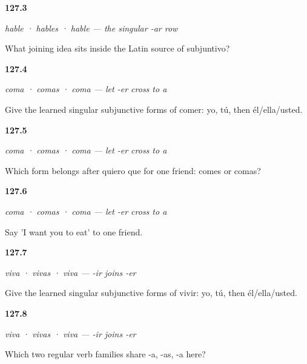 \noindent\begin{minipage}[t]{\linewidth}
\raggedright
\hypertarget{review-ES-C18-subjuntivo-name}{\textbf{127.3}} \emph{hable · hables · hable — the singular -ar row}\par
\small What joining idea sits inside the Latin source of subjuntivo?
\end{minipage}\par\medskip

\noindent\begin{minipage}[t]{\linewidth}
\raggedright
\hypertarget{review-ES-C18-comer-subjuntivo-forms}{\textbf{127.4}} \emph{coma · comas · coma — let -er cross to a}\par
\small Give the learned singular subjunctive forms of comer: yo, tú, then él/ella/usted.
\end{minipage}\par\medskip

\noindent\begin{minipage}[t]{\linewidth}
\raggedright
\hypertarget{review-ES-C18-comer-subjuntivo-fact-wish}{\textbf{127.5}} \emph{coma · comas · coma — let -er cross to a}\par
\small Which form belongs after quiero que for one friend: comes or comas?
\end{minipage}\par\medskip

\noindent\begin{minipage}[t]{\linewidth}
\raggedright
\hypertarget{review-ES-C18-comer-subjuntivo-wanted}{\textbf{127.6}} \emph{coma · comas · coma — let -er cross to a}\par
\small Say 'I want you to eat' to one friend.
\end{minipage}\par\medskip

\noindent\begin{minipage}[t]{\linewidth}
\raggedright
\hypertarget{review-ES-C18-vivir-subjuntivo-forms}{\textbf{127.7}} \emph{viva · vivas · viva — -ir joins -er}\par
\small Give the learned singular subjunctive forms of vivir: yo, tú, then él/ella/usted.
\end{minipage}\par\medskip

\noindent\begin{minipage}[t]{\linewidth}
\raggedright
\hypertarget{review-ES-C18-vivir-subjuntivo-er-ir-match}{\textbf{127.8}} \emph{viva · vivas · viva — -ir joins -er}\par
\small Which two regular verb families share -a, -as, -a here?
\end{minipage}\par\medskip

